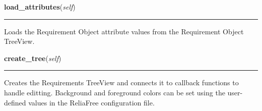     \label{reliafree:requirement:Requirement:load_attributes}

    \vspace{0.5ex}

\hspace{.8\funcindent}\begin{boxedminipage}{\funcwidth}

    \raggedright \textbf{load\_attributes}(\textit{self})

    \vspace{-1.5ex}

    \rule{\textwidth}{0.5\fboxrule}
\setlength{\parskip}{2ex}
    Loads the Requirement Object attribute values from the Requirement 
    Object TreeView.

\setlength{\parskip}{1ex}
    \end{boxedminipage}

    \label{reliafree:requirement:Requirement:create_tree}

    \vspace{0.5ex}

\hspace{.8\funcindent}\begin{boxedminipage}{\funcwidth}

    \raggedright \textbf{create\_tree}(\textit{self})

    \vspace{-1.5ex}

    \rule{\textwidth}{0.5\fboxrule}
\setlength{\parskip}{2ex}
    Creates the Requirements TreeView and connects it to callback functions
    to handle editting.  Background and foreground colors can be set using 
    the user-defined values in the ReliaFree configuration file.

\setlength{\parskip}{1ex}
    \end{boxedminipage}

    \label{reliafree:requirement:Requirement:load_tree}

